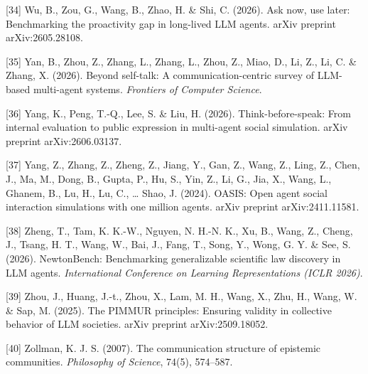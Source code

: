 \documentclass[pdflatex,sn-basic]{sn-jnl}
\begin{document}
{[}34{]} Wu, B., Zou, G., Wang, B., Zhao, H. \& Shi, C. (2026). Ask now, use later: Benchmarking the proactivity gap in long-lived LLM agents. arXiv preprint arXiv:2605.28108.

{[}35{]} Yan, B., Zhou, Z., Zhang, L., Zhang, L., Zhou, Z., Miao, D., Li, Z., Li, C. \& Zhang, X. (2026). Beyond self-talk: A communication-centric survey of LLM-based multi-agent systems. \emph{Frontiers of Computer Science}.

{[}36{]} Yang, K., Peng, T.-Q., Lee, S. \& Liu, H. (2026). Think-before-speak: From internal evaluation to public expression in multi-agent social simulation. arXiv preprint arXiv:2606.03137.

{[}37{]} Yang, Z., Zhang, Z., Zheng, Z., Jiang, Y., Gan, Z., Wang, Z., Ling, Z., Chen, J., Ma, M., Dong, B., Gupta, P., Hu, S., Yin, Z., Li, G., Jia, X., Wang, L., Ghanem, B., Lu, H., Lu, C., \ldots{} Shao, J. (2024). OASIS: Open agent social interaction simulations with one million agents. arXiv preprint arXiv:2411.11581.

{[}38{]} Zheng, T., Tam, K. K.-W., Nguyen, N. H.-N. K., Xu, B., Wang, Z., Cheng, J., Tsang, H. T., Wang, W., Bai, J., Fang, T., Song, Y., Wong, G. Y. \& See, S. (2026). NewtonBench: Benchmarking generalizable scientific law discovery in LLM agents. \emph{International Conference on Learning Representations (ICLR 2026)}.

{[}39{]} Zhou, J., Huang, J.-t., Zhou, X., Lam, M. H., Wang, X., Zhu, H., Wang, W. \& Sap, M. (2025). The PIMMUR principles: Ensuring validity in collective behavior of LLM societies. arXiv preprint arXiv:2509.18052.

{[}40{]} Zollman, K. J. S. (2007). The communication structure of epistemic communities. \emph{Philosophy of Science}, 74(5), 574--587.
\endgroup
\end{document}
